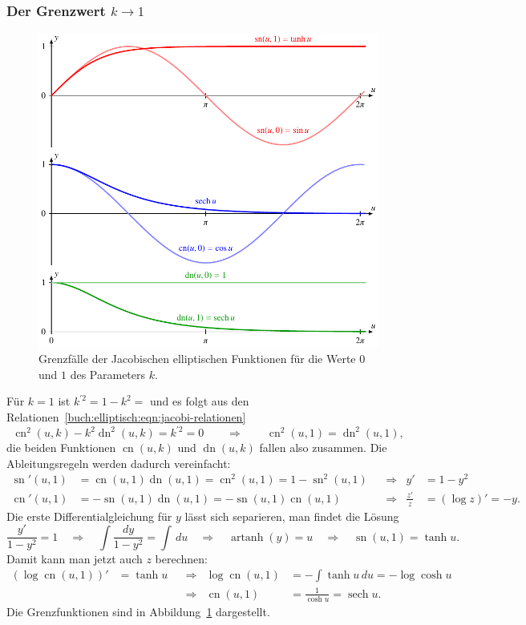 \subsubsection{Der Grenzwert $k\to1$}
\begin{figure}
\centering
\includegraphics{chapters/110-elliptisch/images/sncnlimit.pdf}
\caption{Grenzfälle der Jacobischen elliptischen Funktionen 
für die Werte $0$ und $1$ des Parameters $k$.
\label{buch:elliptisch:fig:sncnlimit}}
\end{figure}
Für $k=1$ ist $k^{\prime2}=1-k^2=$ und es folgt aus den
Relationen~\eqref{buch:elliptisch:eqn:jacobi-relationen}
\[
\operatorname{cn}^2(u,k)
-
k^2
\operatorname{dn}^2(u,k)
=
k^{\prime2}
=
0
\qquad\Rightarrow\qquad
\operatorname{cn}^2(u,1)
=
\operatorname{dn}^2(u,1),
\]
die beiden Funktionen
$\operatorname{cn}(u,k)$
und
$\operatorname{dn}(u,k)$
fallen also zusammen.
Die Ableitungsregeln werden dadurch vereinfacht:
\begin{align*}
\operatorname{sn}'(u,1)
&=
\operatorname{cn}(u,1)
\operatorname{dn}(u,1)
=
\operatorname{cn}^2(u,1)
=
1-\operatorname{sn}^2(u,1)
&&\Rightarrow& y'&=1-y^2
\\
\operatorname{cn}'(u,1)
&=
-
\operatorname{sn}(u,1)
\operatorname{dn}(u,1)
=
-
\operatorname{sn}(u,1)\operatorname{cn}(u,1)
&&\Rightarrow&
\frac{z'}{z}&=(\log z)' = -y.
\end{align*}
Die erste Differentialgleichung für $y$ lässt sich separieren, man findet
die Lösung
\[
\frac{y'}{1-y^2}
=
1
\quad\Rightarrow\quad
\int \frac{dy}{1-y^2} = \int \,du
\quad\Rightarrow\quad
\operatorname{artanh}(y) = u
\quad\Rightarrow\quad
\operatorname{sn}(u,1)=\tanh u.
\]
Damit kann man jetzt auch $z$ berechnen:
\begin{align*}
(\log \operatorname{cn}(u,1))'
&=
\tanh u
&&\Rightarrow&
\log\operatorname{cn}(u,1)
&=
-\int\tanh u\,du
=
-\log\cosh u
\\
&
&&\Rightarrow&
\operatorname{cn}(u,1)
&=
\frac{1}{\cosh u}
=
\operatorname{sech}u.
\end{align*}
Die Grenzfunktionen sind in Abbildung~\ref{buch:elliptisch:fig:sncnlimit}
dargestellt.

